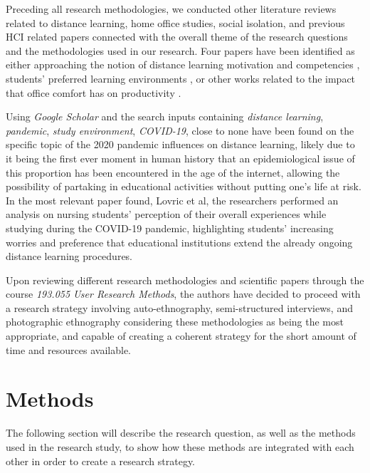 \documentclass{sigchi}
\begin{document}
Preceding all research methodologies, we conducted other literature reviews related to distance learning, home office studies, social isolation, and previous HCI related papers connected with the overall theme of the research questions and the methodologies used in our research. Four papers have been identified as either approaching the notion of distance learning motivation and competencies \cite{kolodziejczak_roszak_2017, simons_leverett_beaumont_2019}, students' preferred learning environments \cite{beckers_voordt_dewulf_2016}, or other works related to the impact that office comfort has on productivity \cite{sakellaris_et_al._2016}. 

Using \emph{Google Scholar} and the search inputs containing \emph{distance learning}, \emph{pandemic}, \emph{study environment}, \emph{COVID-19}, close to none have been found on the specific topic of the 2020 pandemic influences on distance learning, likely due to it being the first ever moment in human history that an epidemiological issue of this proportion has been encountered in the age of the internet, allowing the possibility of partaking in educational activities without putting one's life at risk. In the most relevant paper found, Lovric et al\cite{Lovri__2020}, the researchers performed an analysis on nursing students' perception of their overall experiences while studying during the COVID-19 pandemic, highlighting students' increasing worries and preference that educational institutions extend the already ongoing distance learning procedures.

Upon reviewing different research methodologies and scientific papers through the course \emph{193.055 User Research Methods}, the authors have decided to proceed with a research strategy involving auto-ethnography, semi-structured interviews, and photographic ethnography\cite{adams_ellis_jones_2017, adams_2015, douglas_2003, schwartz_visual_1989} considering these methodologies as being the most appropriate, and capable of creating a coherent strategy for the short amount of time and resources available. 

\section{Methods}

The following section will describe the research question, as well as the methods used in the research study, to show how these methods are integrated with each other in order to create a research strategy.
\end{document}
